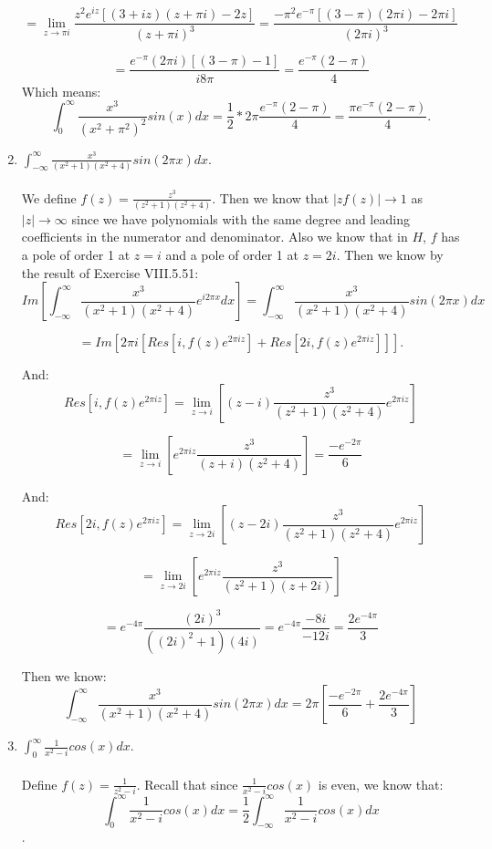 \documentclass[10pt]{article}
\begin{document}
\begin{enumerate}
\[= \lim_{z \to \pi i} \frac{z^2 e^{iz}[(3 + iz)(z+\pi i) - 2z]}{(z + \pi i)^3} = \frac{-\pi^2 e^{-\pi}[(3 - \pi)(2\pi i) - 2\pi i]}{(2\pi i)^3}\]


\[=\frac{e^{-\pi}(2\pi i)[(3 - \pi) - 1]}{i8\pi } = \frac{e^{-\pi}(2 - \pi)}{4 }\]
Which means: 
\[\int_{0}^\infty \frac{x^3}{(x^2 + \pi^2)^2}sin(x)dx = \frac{1}{2} * 2\pi  \frac{e^{-\pi}(2 - \pi)}{4 } = \frac{\pi e^{-\pi}(2 - \pi)}{4 }.  \]

\item $\int_{-\infty}^\infty \frac{x^3}{(x^2 + 1)(x^2 + 4)}sin(2\pi x)dx$. \\\\
We define $f(z) = \frac{z^3}{(z^2 + 1)(z^2 + 4)}$. Then we know that $|zf(z)| \to 1$ as $|z| \to \infty$ since we have polynomials with the same degree and leading coefficients in the numerator and denominator. Also we know that in $H$, $f$ has a pole of order 1 at $z = i$ and a pole of order 1 at $z = 2i$. Then we know by the result of Exercise VIII.5.51: 
\[Im[\int_{-\infty}^\infty \frac{x^3}{(x^2 + 1)(x^2 + 4)}e^{i 2\pi x}dx] = \int_{-\infty}^\infty \frac{x^3}{(x^2 + 1)(x^2 + 4)}sin(2\pi x)dx \]

\[=Im\left[2\pi i \left[ Res[i,f(z)e^{2\pi i z}] + Res[2i,f(z)e^{2\pi i z}]\right] \right]. \]

And: 
\[ Res[i,f(z)e^{2\pi i z}] = \lim_{z \to i}[(z - i)\frac{z^3}{(z^2 + 1)(z^2 + 4)}e^{2\pi i z}] \]

\[= \lim_{z \to i}[e^{2\pi i z}\frac{z^3}{(z + i)(z^2 + 4)}] = \frac{- e^{-2 \pi}}{6}\]

And: 
\[ Res[2i,f(z)e^{2\pi i z}] = \lim_{z \to 2i}[(z - 2i)\frac{z^3}{(z^2 + 1)(z^2 + 4)}e^{2\pi i z}] \]



\[= \lim_{z \to 2i}[e^{2\pi i z}\frac{z^3}{(z^2 + 1)(z + 2i)}]\]

\[=e^{-4 \pi}\frac{(2i)^3}{((2i)^2 + 1)(4i)} = e^{-4 \pi}\frac{-8i}{-12i} = \frac{2e^{-4 \pi}}{3}\]

Then we know: 
\[\int_{-\infty}^\infty \frac{x^3}{(x^2 + 1)(x^2 + 4)}sin(2\pi x)dx = 2\pi [\frac{- e^{-2 \pi}}{6} + \frac{2e^{-4 \pi}}{3}]\]


\item $\int_{0}^\infty \frac{1}{x^2 - i}cos(x)dx$. \\\\

Define $f(z) = \frac{1}{z^2 - i}$. 
Recall that since $\frac{1}{x^2 - i}cos(x)$ is even, we know that: 
\[\int_{0}^\infty \frac{1}{x^2 - i}cos(x)dx = \frac{1}{2}\int_{-\infty}^\infty \frac{1}{x^2 - i}cos(x)dx\]. 


\end{enumerate}
\end{document}
